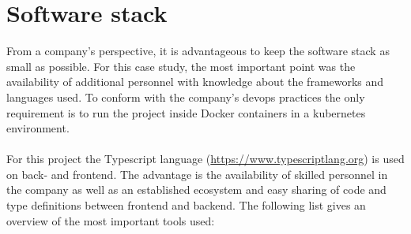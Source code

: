 \section{Software stack}
From a company's perspective, it is advantageous to keep the software stack as small as possible.
For this case study, the most important point was the availability of additional personnel with knowledge about the frameworks and languages used.
To conform with the company's \Gls{devops} practices the only requirement is to run the project inside Docker containers in a \Gls{kubernetes} environment.
\\\\
For this project the Typescript language (\url{https://www.typescriptlang.org}) is used on back- and frontend.
The advantage is the availability of skilled personnel in the company as well as an established ecosystem and easy sharing of code and type definitions between frontend and backend. The following list gives an overview of the most important tools used:

